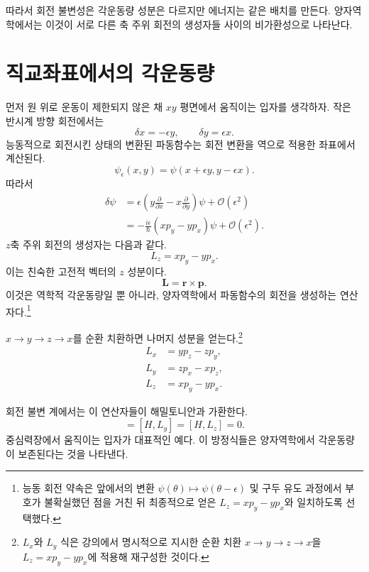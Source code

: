 따라서 회전 불변성은 각운동량 성분은 다르지만 에너지는 같은 배치를 만든다. 양자역학에서는 이것이 서로 다른 축 주위 회전의 생성자들 사이의 비가환성으로 나타난다.

\section{직교좌표에서의 각운동량}

먼저 원 위로 운동이 제한되지 않은 채 \(xy\) 평면에서 움직이는 입자를 생각하자. 작은 반시계 방향 회전에서는
\begin{equation}
\delta x=-\epsilon y,
\qquad
\delta y=\epsilon x.
\end{equation}
능동적으로 회전시킨 상태의 변환된 파동함수는 회전 변환을 역으로 적용한 좌표에서 계산된다.
\begin{equation}
\psi_\epsilon(x,y)
=\psi(x+\epsilon y,y-\epsilon x).
\end{equation}
따라서
\begin{align}
\delta\psi
&=\epsilon\left(
y\frac{\partial}{\partial x}
-x\frac{\partial}{\partial y}
\right)\psi
+\mathcal O(\epsilon^2)\\
&=-\frac{i\epsilon}{\hbar}
\left(xp_y-yp_x\right)\psi
+\mathcal O(\epsilon^2).
\end{align}
\(z\)축 주위 회전의 생성자는 다음과 같다.
\begin{equation}
L_z=xp_y-yp_x.
\end{equation}
이는 친숙한 고전적 벡터의 \(z\) 성분이다.
\begin{equation}
\mathbf L=\mathbf r\times\mathbf p.
\end{equation}
이것은 역학적 각운동량일 뿐 아니라, 양자역학에서 파동함수의 회전을 생성하는 연산자다.\footnote{능동 회전 약속은 앞에서의 변환 \(\psi(\theta)\mapsto\psi(\theta-\epsilon)\) 및 구두 유도 과정에서 부호가 불확실했던 점을 거친 뒤 최종적으로 얻은 \(L_z=xp_y-yp_x\)와 일치하도록 선택했다.}

\(x\to y\to z\to x\)를 순환 치환하면 나머지 성분을 얻는다.\footnote{\(L_x\)와 \(L_y\) 식은 강의에서 명시적으로 지시한 순환 치환 \(x\to y\to z\to x\)을 \(L_z=xp_y-yp_x\)에 적용해 재구성한 것이다.}
\begin{align}
L_x&=yp_z-zp_y,\\
L_y&=zp_x-xp_z,\\
L_z&=xp_y-yp_x.
\end{align}

회전 불변 계에서는 이 연산자들이 해밀토니안과 가환한다.
\begin{equation}
[H,L_x]=[H,L_y]=[H,L_z]=0.
\end{equation}
중심력장에서 움직이는 입자가 대표적인 예다. 이 방정식들은 양자역학에서 각운동량이 보존된다는 것을 나타낸다.

